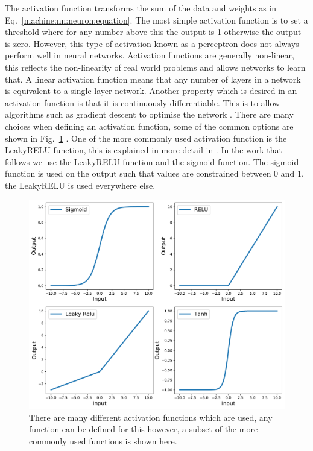 The activation function transforms the sum of the data and weights as in Eq.~\ref{machine:nn:neuron:equation}. 
The most simple activation function is to set a threshold where for any number above this the output is 1 otherwise the output is zero. However, this type of activation known as a perceptron does not always perform well in neural networks.
Activation functions are generally non-linear, this reflects the non-linearity of real world problems and allows networks to learn that. 
A linear activation function means that any number of layers in a network is equivalent to a single layer network.
Another property which is desired in an activation function is that it is continuously differentiable. This is to allow algorithms such as gradient descent to optimise the network \citep{nwankpa2018ActivationFunctions}. 
There are many choices when defining an activation function, some of the common options are shown in Fig.~\ref{machine:nn:activation:plot} \citep{nwankpa2018ActivationFunctions}.
One of the more commonly used activation function is the LeakyRELU function, this is explained in more detail in \citep{maas2013RectifierNonlinearities}.
In the work that follows we use the LeakyRELU function and the sigmoid function.
The sigmoid function is used on the output such that values are constrained between 0 and 1, the LeakyRELU is used everywhere else. 


\begin{figure}[ht]
	\centering
	\includegraphics[width=0.8\columnwidth]{C4_cnn/activations.pdf}
	\caption[Examples of activation functions.]{There are many different activation functions which are used, any function can be defined for this however, a subset of the more commonly used functions is shown here.}
	\label{machine:nn:activation:plot}
\end{figure}





